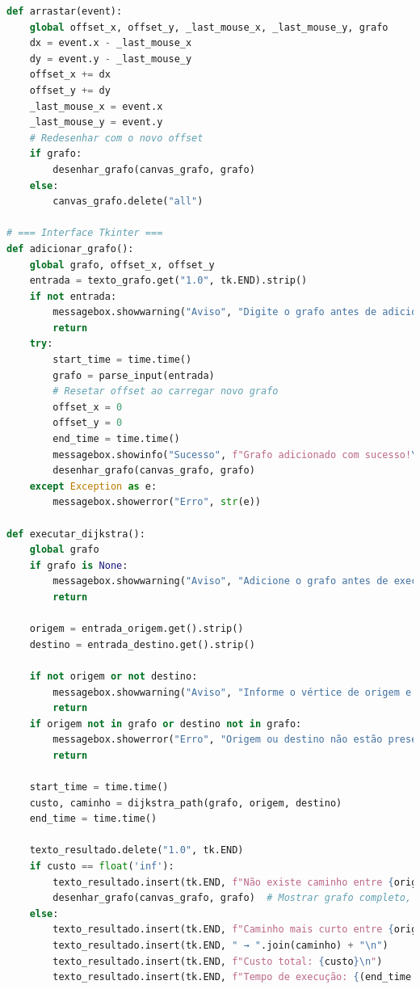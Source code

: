 \documentclass[12pt,a4paper]{report}
\begin{document}
\begin{lstlisting}[language=Python, caption=Dijkstra em Python (parcial)]
def arrastar(event):
    global offset_x, offset_y, _last_mouse_x, _last_mouse_y, grafo
    dx = event.x - _last_mouse_x
    dy = event.y - _last_mouse_y
    offset_x += dx
    offset_y += dy
    _last_mouse_x = event.x
    _last_mouse_y = event.y
    # Redesenhar com o novo offset
    if grafo:
        desenhar_grafo(canvas_grafo, grafo)
    else:
        canvas_grafo.delete("all")

# === Interface Tkinter ===
def adicionar_grafo():
    global grafo, offset_x, offset_y
    entrada = texto_grafo.get("1.0", tk.END).strip()
    if not entrada:
        messagebox.showwarning("Aviso", "Digite o grafo antes de adicionar.")
        return
    try:
        start_time = time.time()
        grafo = parse_input(entrada)
        # Resetar offset ao carregar novo grafo
        offset_x = 0
        offset_y = 0
        end_time = time.time()
        messagebox.showinfo("Sucesso", f"Grafo adicionado com sucesso!\nTempo de processamento: {(end_time - start_time):.4f}s")
        desenhar_grafo(canvas_grafo, grafo)
    except Exception as e:
        messagebox.showerror("Erro", str(e))

def executar_dijkstra():
    global grafo
    if grafo is None:
        messagebox.showwarning("Aviso", "Adicione o grafo antes de executar o Dijkstra.")
        return

    origem = entrada_origem.get().strip()
    destino = entrada_destino.get().strip()

    if not origem or not destino:
        messagebox.showwarning("Aviso", "Informe o vértice de origem e o de destino.")
        return
    if origem not in grafo or destino not in grafo:
        messagebox.showerror("Erro", "Origem ou destino não estão presentes no grafo.")
        return

    start_time = time.time()
    custo, caminho = dijkstra_path(grafo, origem, destino)
    end_time = time.time()

    texto_resultado.delete("1.0", tk.END)
    if custo == float('inf'):
        texto_resultado.insert(tk.END, f"Não existe caminho entre {origem} e {destino}.\n")
        desenhar_grafo(canvas_grafo, grafo)  # Mostrar grafo completo, pois não há caminho
    else:
        texto_resultado.insert(tk.END, f"Caminho mais curto entre {origem} e {destino}:\n")
        texto_resultado.insert(tk.END, " → ".join(caminho) + "\n")
        texto_resultado.insert(tk.END, f"Custo total: {custo}\n")
        texto_resultado.insert(tk.END, f"Tempo de execução: {(end_time - start_time):.6f} segundos\n")


\end{lstlisting}
\end{document}

